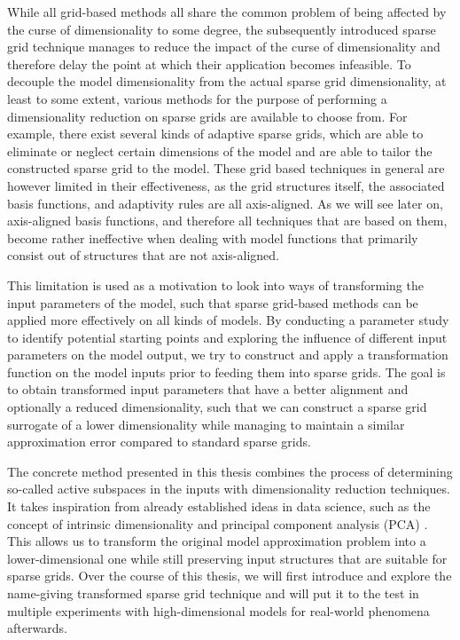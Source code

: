 \documentclass[
  a4paper,  %
  twoside,  %
  bibliography=totoc,
  headsepline,
  cleardoublepage=empty,
  parskip=half,
  draft=false
]{scrbook}
\begin{document}
While all grid-based methods all share the common problem of being affected by the curse of dimensionality to some degree, the subsequently introduced sparse grid technique \cite{Zenger1991} manages to reduce the impact of the curse of dimensionality and therefore delay the point at which their application becomes infeasible.
To decouple the model dimensionality from the actual sparse grid dimensionality, at least to some extent, various methods for the purpose of performing a dimensionality reduction on sparse grids are available to choose from.
For example, there exist several kinds of adaptive sparse grids, which are able to eliminate or neglect certain dimensions of the model and are able to tailor the constructed sparse grid to the model.
These grid based techniques in general are however limited in their effectiveness, as the grid structures itself, the associated basis functions, and adaptivity rules are all axis-aligned.
As we will see later on, axis-aligned basis functions, and therefore all techniques that are based on them, become rather ineffective when dealing with model functions that primarily consist out of structures that are not axis-aligned.

This limitation is used as a motivation to look into ways of transforming the input parameters of the model, such that sparse grid-based methods can be applied more effectively on all kinds of models.
By conducting a parameter study to identify potential starting points and exploring the influence of different input parameters on the model output, we try to construct and apply a transformation function on the model inputs prior to feeding them into sparse grids.
The goal is to obtain transformed input parameters that have a better alignment and optionally a reduced dimensionality, such that we can construct a sparse grid surrogate of a lower dimensionality while managing to maintain a similar approximation error compared to standard sparse grids.

The concrete method presented in this thesis combines the process of determining so-called active subspaces in the inputs \cite{Constantine2015} with dimensionality reduction techniques.
It takes inspiration from already established ideas in data science, such as the concept of intrinsic dimensionality \cite{Bennett1969} and principal component analysis (PCA) \cite{Abdi2010}.
This allows us to transform the original model approximation problem into a lower-dimensional one while still preserving input structures that are suitable for sparse grids.
Over the course of this thesis, we will first introduce and explore the name-giving transformed sparse grid technique and will put it to the test in multiple experiments with high-dimensional models for real-world phenomena afterwards.
\end{document}
